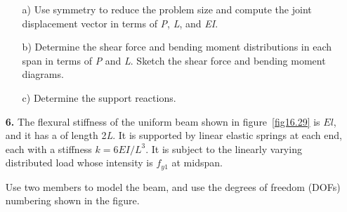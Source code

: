 \documentclass{AeroStructure-ERJohnson}
\begin{document}
\begin{exercise}
\begin{enumerate}[\textbf{2.}]

\begin{enumerate}[b)]
\item[{\hskip13pt}a)] Use symmetry to reduce the problem size and compute the joint displacement vector in terms of \textit{P}, \textit{L}, and \textit{EI}.
\item[{\hskip13pt}b)] Determine the shear force and bending moment distributions in each span in terms of \textit{P} and \textit{L}. Sketch the shear force and bending moment diagrams.
\item[{\hskip13pt}c)] Determine the support reactions.
\end{enumerate}

\item[\textbf{6.}] The flexural stiffness of the uniform beam shown in figure~\ref{fig16.29} is $E l$, and it has a of length 2\textit{L}. It is supported by linear elastic springs at each end, each with a stiffness $k=6 E I / L^{3}$. It is subject to the linearly varying distributed load whose intensity is $f_{y 1}$ at midspan.


Use two members to model the beam, and use the degrees of freedom (DOFs) numbering shown in the figure.


\end{enumerate}
\end{exercise}
\end{document}
